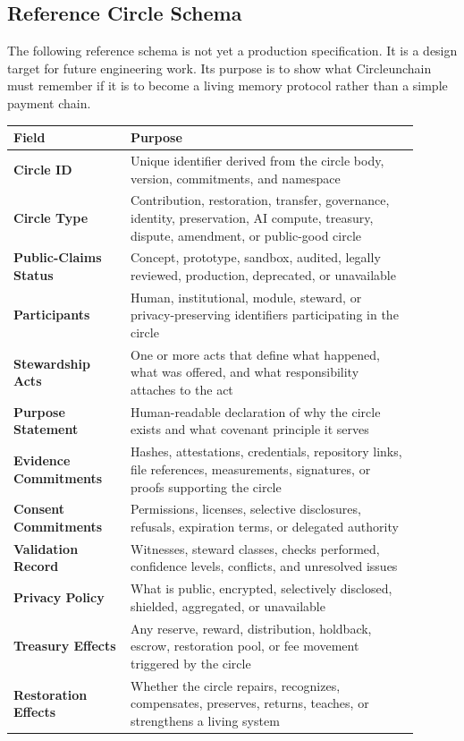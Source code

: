 \documentclass[12pt]{article}
\begin{document}
\aftCircleLifecycleGraphic

\subsection{Reference Circle Schema}

The following reference schema is not yet a production specification. It is a design target for future engineering work. Its purpose is to show what Circleunchain must remember if it is to become a living memory protocol rather than a simple payment chain.

\begin{longtable}{>{\bfseries}p{0.26\linewidth}p{0.64\linewidth}}
\toprule
Field & Purpose \\
\midrule
Circle ID & Unique identifier derived from the circle body, version, commitments, and namespace \\
Circle Type & Contribution, restoration, transfer, governance, identity, preservation, AI compute, treasury, dispute, amendment, or public-good circle \\
Public-Claims Status & Concept, prototype, sandbox, audited, legally reviewed, production, deprecated, or unavailable \\
Participants & Human, institutional, module, steward, or privacy-preserving identifiers participating in the circle \\
Stewardship Acts & One or more acts that define what happened, what was offered, and what responsibility attaches to the act \\
Purpose Statement & Human-readable declaration of why the circle exists and what covenant principle it serves \\
Evidence Commitments & Hashes, attestations, credentials, repository links, file references, measurements, signatures, or proofs supporting the circle \\
Consent Commitments & Permissions, licenses, selective disclosures, refusals, expiration terms, or delegated authority \\
Validation Record & Witnesses, steward classes, checks performed, confidence levels, conflicts, and unresolved issues \\
Privacy Policy & What is public, encrypted, selectively disclosed, shielded, aggregated, or unavailable \\
Treasury Effects & Any reserve, reward, distribution, holdback, escrow, restoration pool, or fee movement triggered by the circle \\
Restoration Effects & Whether the circle repairs, recognizes, compensates, preserves, returns, teaches, or strengthens a living system \\

\end{longtable}
\end{document}
